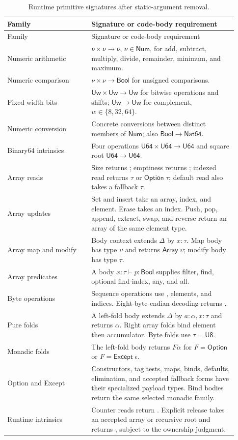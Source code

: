 \documentclass[11pt]{article}
\newcommand{\code}[1]{\texttt{\seqsplit{#1}}}
\newcommand{\ty}[1]{\mathsf{#1}}
\begin{document}
\begin{longtable}{L{0.34\linewidth}L{0.59\linewidth}}
\caption{Runtime primitive signatures after static-argument removal.}\label{tab:primitives}\\
\toprule Family & Signature or code-body requirement\\\midrule\endfirsthead
\toprule Family & Signature or code-body requirement\\\midrule\endhead
Numeric arithmetic & $\nu\times\nu\to\nu$, $\nu\in\ty{Num}$, for add, subtract, multiply, divide, remainder, minimum, and maximum.\\
Numeric comparison & $\nu\times\nu\to\ty{Bool}$ for unsigned comparisons.\\
Fixed-width bits & $\ty{Uw}\times\ty{Uw}\to\ty{Uw}$ for bitwise operations and shifts; $\ty{Uw}\to\ty{Uw}$ for complement, $w\in\{8,32,64\}$.\\
Numeric conversion & Concrete conversions between distinct members of $\ty{Num}$; also $\ty{Bool}\to\ty{Nat64}$.\\
Binary64 intrinsics & Four operations $\ty{U64}\times\ty{U64}\to\ty{U64}$ and square root $\ty{U64}\to\ty{U64}$.\\
Array reads & Size returns \code{Nat64}; emptiness returns \code{Bool}; indexed read returns $\tau$ or $\ty{Option}\;\tau$; default read also takes a fallback $\tau$.\\
Array updates & Set and insert take an array, index, and element.  Erase takes an index.  Push, pop, append, extract, swap, and reverse return an array of the same element type.\\
Array map and modify & Body context extends $\Delta$ by $x:\tau$.  Map body has type $\upsilon$ and returns $\ty{Array}\;\upsilon$; modify body has type $\tau$.\\
Array predicates & A body $x:\tau\vdash p:\ty{Bool}$ supplies filter, find, optional find-index, any, and all.\\
Byte operations & Sequence operations use \code{Bytes}, \code{U8} elements, and \code{Nat64} indices.  Eight-byte endian decoding returns \code{U64}.\\
Pure folds & A left-fold body extends $\Delta$ by $a:\alpha,x:\tau$ and returns $\alpha$.  Right array folds bind element then accumulator.  Byte folds use $\tau=\ty{U8}$.\\
Monadic folds & The left-fold body returns $F\alpha$ for $F=\ty{Option}$ or $F=\ty{Except}\;\epsilon$.\\
Option and Except & Constructors, tag tests, maps, binds, defaults, elimination, and accepted fallback forms have their specialized payload types.  Bind bodies return the same selected monadic family.\\
Runtime intrinsics & Counter reads return \code{U64}.  Explicit release takes an accepted array or recursive root and returns \code{U64}, subject to the ownership judgment.\\
\bottomrule
\end{longtable}
\end{document}
